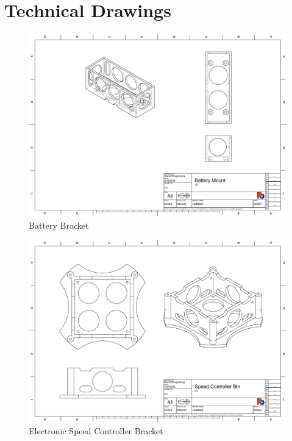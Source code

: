 \documentclass[pdftex,11pt]{article}
\begin{document}
\clearpage

\section{Technical Drawings}
\label{sec:TechDraw}

\begin{figure}[!h]
	\centering
		\includegraphics[width=1\textwidth]{./graphics/BatteryBoxV5-eps-converted-to.pdf}
	\caption{Battery Bracket}
	\label{fig:BattBin}
\end{figure}

\begin{figure}[!h]
	\centering
		\includegraphics[width=1\textwidth]{./graphics/Speed_controler_bin-eps-converted-to.pdf}
	\caption{Electronic Speed Controller Bracket}
	\label{fig:partbin}
\end{figure}
\end{document}
